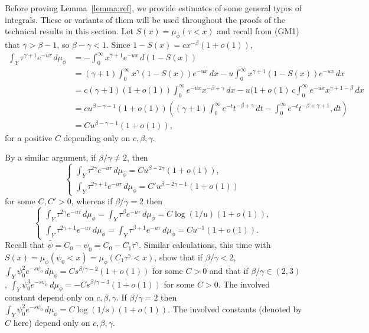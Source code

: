 \documentclass[12pt]{article}
\numberwithin{equation}{section}
\begin{document}
Before proving Lemma~\ref{lemma:ref}, we provide estimates of some general types of integrals. These or variants of them will be used throughout the proofs of the technical results in this section. Let $S(x)=\mu_{\overline{\phi}}(\tau<x)$ and recall from (GM1) that $\gamma>\beta-1$, so $\beta-\gamma<1$.
Since $1-S(x)=c x^{-\beta}(1+o(1))$,
\begin{align}\label{eq:utauprec}
 \nonumber \int_Y \tau^{\gamma+1} e^{-u\tau}\, d\mu_{\overline{\phi}} &=- \int_0^{\infty} x^{\gamma+1} e^{-ux}\, d(1-S(x))\\
 \nonumber &=(\gamma+1)\int_0^\infty x^{\gamma}(1-S(x)) e^{-ux}\, dx - u\int_0^\infty x^{\gamma+1}(1-S(x)) e^{-ux}\, d x 
 \\
 \nonumber &=c(\gamma+1)(1+o(1))\int_0^\infty e^{-ux} x^{-\beta+\gamma}\, dx - u(1+o(1)\, c\int_0^\infty e^{-ux} x^{\gamma+1-\beta}\, d x\\
 \nonumber &= c u^{\beta-\gamma-1}(1+o(1))
 \left((\gamma+1) \int_0^\infty e^{-t}t^{-\beta+\gamma} \, d t - \int_0^\infty e^{-t}t^{-\beta+\gamma+1}, d t\right)\\
 & =C u^{\beta-\gamma-1}(1+o(1)),
 \end{align}
 for a positive $C$ depending only on $c,\beta,\gamma$.
 
 By a similar argument, if $\beta/\gamma\ne 2$, then
 \begin{equation}\label{eq:utauneq2}
\begin{cases}  \int_Y \tau^{2\gamma} e^{-u\tau}\, d\mu_{\overline{\phi}}= Cu^{\beta-2\gamma}(1+o(1)),\\[2mm]
 \int_Y \tau^{2\gamma+1} e^{-u\tau}\, d\mu_{\overline{\phi}}= C'u^{\beta-2\gamma-1}(1+o(1))
 \end{cases}
 \end{equation}
for some $C, C' > 0$, whereas if $\beta/\gamma=2$ then
\begin{equation}\label{eq:utaueq2}
 \begin{cases}
 \int_Y \tau^{2\gamma} e^{-u\tau}\, d\mu_{\overline{\phi}}=  \int_Y \tau^{\beta} e^{-u\tau}\, d\mu_{\overline{\phi}}=C\log(1/u)(1+o(1)),\\[2mm]
 \int_Y \tau^{2\gamma+1} e^{-u\tau}\, d\mu_{\overline{\phi}}=  \int_Y \tau^{\beta+1} e^{-u\tau}\, d\mu_{\overline{\phi}}=Cu^{-1}(1+o(1)).
 \end{cases}
\end{equation}
 Recall that $\bar\psi=C_0-\psi_0=C_0-C_1\tau^\gamma$.
 Similar calculations, this time with $S(x)=\mu_{\overline{\phi}}(\psi_0<x)=\mu_{\overline{\phi}}(C_1\tau^\gamma<x)$, show that
 if $\beta/\gamma<2$, $\int_Y \psi_0^{2} e^{-s\psi_0}\, d\mu_{\overline{\phi}} =Cs^{\beta/\gamma-2}(1+o(1))$ for some $C>0$
 and that if $\beta/\gamma\in (2,3)$, $\int_Y \psi_0^{3} e^{-s\psi_0}\, d\mu_{\overline{\phi}} =-Cs^{\beta/\gamma-3}(1+o(1))$
 for some $C>0$. The involved constant depend only on $c, \beta, \gamma$.
 If $\beta/\gamma=2$ then
 \(
 \int_Y \psi_0^{2} e^{-s\psi_0}\, d\mu_{\overline{\phi}} =C\log(1/s)(1+o(1)).
  \)
  The involved constants (denoted by $C$ here) depend only on $c, \beta, \gamma$.  
  
\end{document}
